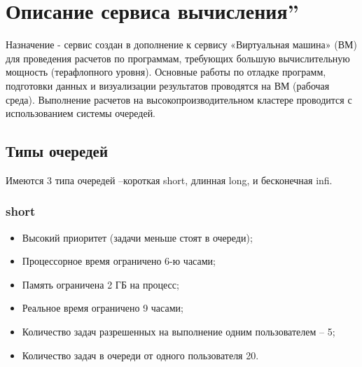\documentclass[a4paper,8pt]{extreport}
\newcounter{ex}
\begin{document}
\tableofcontents
\thispagestyle{empty}

\lstset{language=, linewidth=1.0\textwidth, breaklines=true,
breakatwhitespace=true, frame=single, framexleftmargin=0em,
resetmargins=true,
columns=flexible,
flexiblecolumns,
inputencoding=utf8,
extendedchars=\true,
escapechar=\%,
texcl,
}
\frenchspacing

\pagestyle{fancy}

\chapter{Описание сервиса  вычисления\textquotedblright}

Назначение - сервис создан в дополнение к сервису «Виртуальная машина» (ВМ) для проведения расчетов по программам,
требующих большую вычислительную мощность (терафлопного уровня). Основные работы по отладке программ, 
подготовки данных и визуализации результатов проводятся на ВМ (рабочая среда). Выполнение расчетов на 
высокопроизводительном кластере проводится с использованием системы очередей. 

\section{Типы очередей}
Имеются 3 типа очередей –короткая short, длинная long, и бесконечная infi. 

\subsection{short}
\begin{itemize}
  \item Высокий приоритет (задачи меньше стоят в очереди);
  \item Процессорное время ограничено 6-ю часами;
  \item Память ограничена 2 ГБ на процесс;
  \item Реальное время ограничено 9 часами;
  \item Количество задач разрешенных на выполнение одним пользователем -- 5;
  \item Количество задач в очереди от одного пользователя 20.
\end{itemize}
\end{document}
